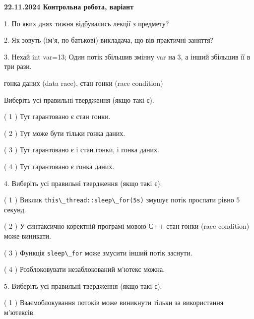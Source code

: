 \documentclass[12pt, ukrainian]{article}
\def\code#1{\Verb!#1!}
\begin{document}
\vspace{4mm}
\newpage
\begin {large}

\textbf{22.11.2024 Контрольна робота, варіант  }\par


{
1. По яких днях тижня відбувались лекції з предмету?



\vspace{5mm}
2. Як зовуть (ім'я, по батькові) викладача, що вів практичні заняття?



\vspace{5mm}
3. Нехай int var=13; Один потік збільшив змінну var на 3, а інший збільшив її в три рази.

гонка даних (data race), стан гонки (race condition)

Виберіть усі правильні твердження (якщо такі є).\par
\vspace{2mm}
( 1 ) Тут гарантовано є стан гонки.%

( 2 ) Тут може бути тільки гонка даних.%

( 3 ) Тут гарантовано є і стан гонки, і гонка даних.%

( 4 ) Тут гарантовано є гонка даних.%


\vspace{5mm}
4. Виберіть усі правильні твердження (якщо такі є).\par
\vspace{2mm}

( 1 ) Виклик \code{this\_thread::sleep\_for(5s)} змушує потік проспати рівно 5 секунд.%

( 2 ) У синтаксично коректній програмі мовою С++ стан гонки (race condition) може виникати.%

( 3 ) Функція \code{sleep\_for} може змусити інший потік заснути.%

( 4 ) Розблоковувати незаблокований м’ютекс можна.%


\vspace{5mm}
5. Виберіть усі правильні твердження (якщо такі є).\par
\vspace{2mm}

( 1 ) Взаємоблокування потоків може виникнути тільки за використання м’ютексів.%

}
\end{large}
\end{document}

